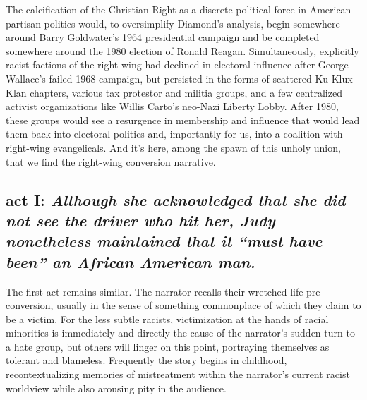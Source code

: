 \documentclass[11pt]{article}
\begin{document}
The calcification of the Christian Right as a discrete political force in American partisan politics would, to oversimplify Diamond's analysis, begin somewhere around Barry Goldwater's 1964 presidential campaign and be completed somewhere around the 1980 election of Ronald Reagan.\autocite[172]{Di95} Simultaneously, explicitly racist factions of the right wing had declined in electoral influence after George Wallace's failed 1968 campaign, but persisted in the forms of scattered Ku Klux Klan chapters, various tax protestor and militia groups, and a few centralized activist organizations like Willis Carto's neo-Nazi Liberty Lobby.\autocite[257]{Di95} After 1980, these groups would see a resurgence in membership and influence that would lead them back into electoral politics and, importantly for us, into a coalition with right-wing evangelicals. And it's here, among the spawn of this unholy union, that we find the right-wing conversion narrative.

\subsection*{act I: {\itshape Although she acknowledged that she did not see the driver who hit her, Judy nonetheless maintained that it ``must have been'' an African American man.}\autocite[41]{Bl02}}

The first act remains similar. The narrator recalls their wretched life pre-conversion, usually in the sense of something commonplace of which they claim to be a victim. For the less subtle racists, victimization at the hands of racial minorities is immediately and directly the cause of the narrator's sudden turn to a hate group, but others will linger on this point, portraying themselves as tolerant and blameless. Frequently the story begins in childhood, recontextualizing memories of mistreatment within the narrator's current racist worldview while also arousing pity in the audience. 
\end{document}
